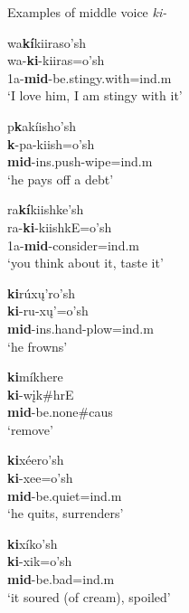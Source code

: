 \newpage

\begin{exe}
\item\label{middlevoiceexamples} Examples of middle voice \textit{ki-}

	\begin{xlist}
	\item \glll wa\textbf{kí}kiiraso'sh\\
	wa-\textbf{ki}-kiiras=o'sh\\
	1a-\textbf{mid}-\textnormal{be.stingy.with}=ind.m\\
	\glt `I love him, I am stingy with it' \citep[111]{hollow1970}
	
	\item \glll p\textbf{k}akíisho'sh\\
	\textbf{k}-pa-kiish=o'sh\\
	\textbf{mid}-ins.push-\textnormal{wipe}=ind.m\\
	\glt `he pays off a debt' \citep[111]{hollow1970}
	
	\item \glll ra\textbf{kí}kiishke'sh\\
	ra-\textbf{ki}-kiishkE=o'sh\\
	1a-\textbf{mid}-\textnormal{consider}=ind.m\\
	\glt `you think about it, taste it' \citep[112]{hollow1970}
	
	\item \glll \textbf{ki}rúxų'ro'sh\\
	\textbf{ki}-ru-xų'=o'sh\\
	\textbf{mid}-ins.hand-\textnormal{plow}=ind.m\\
	\glt `he frowns' \citep[331]{hollow1970}
	
	\item \glll \textbf{ki}míkhere\\
	\textbf{ki}-wįk\#hrE\\
	\textbf{mid}-\textnormal{be.none}\#caus\\
	\glt `remove' \citep[113]{hollow1970}
	
	\item \glll \textbf{ki}xéero'sh\\
	\textbf{ki}-xee=o'sh\\
	\textbf{mid}-\textnormal{be.quiet}=ind.m\\
	\glt `he quits, surrenders' \citep[312]{hollow1970}
	
	\item \glll \textbf{ki}xíko'sh\\
	\textbf{ki}-xik=o'sh\\
	\textbf{mid}-\textnormal{be.bad}=ind.m\\
	\glt `it soured (of cream), spoiled' \citep[314]{hollow1970}
	

\end{xlist}
\end{exe}
